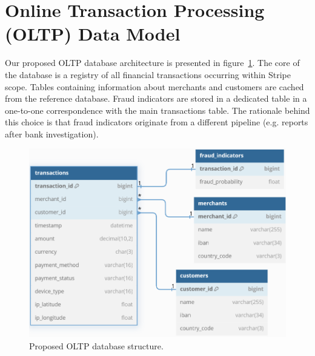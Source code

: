 \documentclass[11pt,a4paper,computermodern]{article}
\begin{document}
\section*{Online Transaction Processing (OLTP) Data Model}

Our proposed OLTP database architecture is presented in figure~\ref{fig:OLTP}. The core of the database is a registry of all financial transactions occurring within Stripe scope. Tables containing information about merchants and customers are cached from the reference database. Fraud indicators are stored in a dedicated table in a one-to-one correspondence with the main transactions table. The rationale behind this choice is that fraud indicators originate from a different pipeline (e.g. reports after bank investigation).


\begin{figure}
	\centering
	\includegraphics[scale=0.7]{./figures/OLTP}
	\caption{Proposed OLTP database structure.}
	\label{fig:OLTP}
\end{figure}
\end{document}

